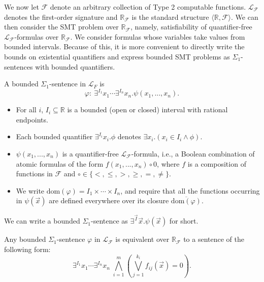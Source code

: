 \documentclass[prodmode]{acmsmall} %
\newcommand{\dom}{\mathrm{dom}}
\begin{document}
We now let $\mathcal{F}$ denote an arbitrary collection of Type 2 computable functions. $\mathcal{L}_{\mathcal{F}}$ denotes the first-order signature and $\mathbb{R}_{\mathcal{F}}$ is the standard structure $\langle \mathbb{R}, \mathcal{F}\rangle$. We can then consider the SMT problem over $\mathbb{R}_{\mathcal{F}}$, namely, satisfiability of quantifier-free $\mathcal{L}_{\mathcal{F}}$-formulas over $\mathbb{R}_{\mathcal{F}}$. We consider formulas whose variables take values from bounded intervals. Because of this, it is more convenient to directly write the bounds on existential quantifiers and express bounded SMT problems as $\Sigma_1$-sentences with bounded quantifiers.
\begin{definition}
A bounded $\Sigma_1$-sentence in $\mathcal{L}_{F}$ is
$$\varphi:\ \exists^{I_1}x_1\cdots \exists^{I_n}x_n. \psi(x_1,...,x_n).$$
\begin{itemize}
\item For all $i$, $I_i\subseteq \mathbb{R}$ is a bounded (open or closed) interval with rational endpoints. 
\item Each bounded quantifier $\exists^{I_i}x_i.\phi$ denotes $\exists x_i.(x_i\in I_i\wedge \phi)$. 
\item $\psi(x_1,...,x_n)$ is a quantifier-free $\mathcal{L}_{\mathcal{F}}$-formula, i.e., a Boolean combination of atomic formulas of the form $f(x_1,...,x_n)\circ 0$, where $f$ is a composition of functions in $\mathcal{F}$ and $\circ\in\{<,\leq, >, \geq, =, \neq \}$. 
\item We write $\dom(\varphi)= I_1\times \cdots \times I_n$, and require that all the functions occurring in $\psi(\vec x)$ are defined everywhere over its closure $\overline{\dom(\varphi)}$.
\end{itemize}
We can write a bounded $\Sigma_1$-sentence as $\exists^{\vec I}\vec x.\psi(\vec x)$ for short.
\end{definition}
\begin{lemma}\label{pre1}
Any bounded $\Sigma_1$-sentence $\varphi$ in $\mathcal{L}_{\mathcal{F}}$ is equivalent over $\mathbb{R}_{\mathcal{F}}$ to a sentence of the following form:
$$\exists^{I_1}x_1\cdots \exists^{I_n}x_n\;\bigwedge_{i=1}^m(\bigvee_{j=1}^{k_i} f_{ij}(\vec x)=0).$$ 
\end{lemma}
\end{document}
